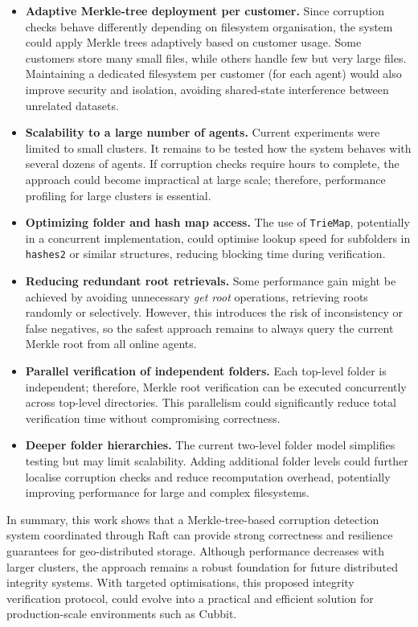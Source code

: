 \begin{itemize}
    \item \textbf{Adaptive Merkle-tree deployment per customer.}
    Since corruption checks behave differently depending on filesystem
    organisation, the system could apply Merkle trees adaptively based on customer usage.
    Some customers store many small files, while others handle few but very large files.
    Maintaining a dedicated filesystem per customer (for each agent) would also improve security and isolation, avoiding shared-state interference between unrelated datasets.

    \item \textbf{Scalability to a large number of agents.}
    Current experiments were limited to small clusters.
    It remains to be tested how the system behaves with several dozens of agents.
    If corruption checks require hours to complete, the approach could become impractical at large scale; therefore, performance profiling for large clusters is essential.

    \item \textbf{Optimizing folder and hash map access.}
    The use of \texttt{TrieMap}, potentially in a concurrent implementation, could optimise lookup speed for subfolders in \texttt{hashes2} or similar structures, reducing blocking time during verification.

    \item \textbf{Reducing redundant root retrievals.}
    Some performance gain might be achieved by avoiding unnecessary \emph{get root} operations, retrieving roots randomly or selectively.
    However, this introduces the risk of inconsistency or false negatives, so the safest approach remains to always query the current Merkle root from all online agents.

    \item \textbf{Parallel verification of independent folders.}
    Each top-level folder is independent; therefore, Merkle root verification can be executed concurrently across top-level directories.
    This parallelism could significantly reduce total verification time without compromising correctness.

    \item \textbf{Deeper folder hierarchies.}
    The current two-level folder model simplifies testing but may limit scalability.
    Adding additional folder levels could further localise corruption checks and reduce recomputation overhead, potentially improving performance for large and complex filesystems.
\end{itemize}

In summary, this work shows that a Merkle-tree-based corruption detection system coordinated through Raft can provide strong correctness and resilience guarantees for geo-distributed storage.
Although performance decreases with larger clusters, the approach remains a robust foundation for future distributed integrity systems.
With targeted optimisations, this proposed integrity verification protocol, could evolve into a practical and efficient solution for production-scale environments such as Cubbit.
